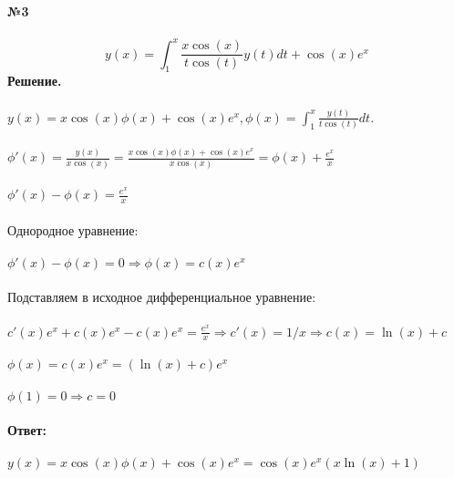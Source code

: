 \documentclass[10pt,a4paper]{article}
\begin{document}
	\noindent\textbf{№3} \\  \\
	$$y(x) = \int_{1}^{x}\frac{x\cos(x)}{t\cos(t)}y(t)dt + \cos(x) e^x$$
	\textbf{Решение.} \\ \\
	$y(x) = x\cos(x)\phi(x) + \cos(x) e^x, \phi(x) = \int_{1}^{x}\frac{y(t)}{t\cos(t)}dt.$ \\  \\
	$\phi'(x) = \frac{y(x)}{x\cos(x)} = \frac{x\cos(x)\phi(x) + \cos(x) e^x}{x\cos(x)} = \phi(x) + \frac{e^x}{x}$ \\ \\
	$\phi'(x) - \phi(x) = \frac{e^x}{x}$ \\ \\ 
	Однородное уравнение: \\ \\
	$\phi'(x) - \phi(x) = 0 \Rightarrow \phi(x) = c(x)e^x $\\ \\ 
	Подставляем в исходное дифференциальное уравнение: \\ \\
	$c'(x)e^x + c(x)e^x - c(x)e^x = \frac{e^x}{x} \Rightarrow c'(x) = 1 / x \Rightarrow c(x) = \ln(x) +c $ \\ \\
	$\phi(x) = c(x)e^x = (\ln(x) + c)e^x$ \\ \\
	$\phi(1) = 0 \Rightarrow c = 0$ \\ \\
	\textbf{Ответ:} \\ \\
	$y(x) = x\cos(x)\phi(x) + \cos(x) e^x = \cos(x) e^x (x\ln(x) + 1)$ \\ \\
	
\end{document}

